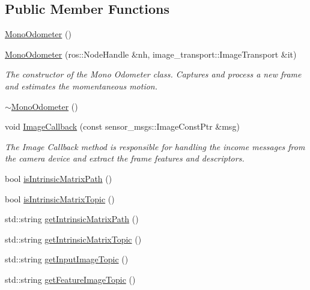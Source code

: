 \subsection*{\-Public \-Member \-Functions}
\begin{DoxyCompactItemize}
\item 
\hyperlink{classLRM_1_1MonoOdometer_a1ea1f329885905fcab0e3f790253df9d}{\-Mono\-Odometer} ()
\item 
\hyperlink{classLRM_1_1MonoOdometer_ae849abdcd3e0b49be6b1672b292c86ba}{\-Mono\-Odometer} (ros\-::\-Node\-Handle \&nh, image\-\_\-transport\-::\-Image\-Transport \&it)
\begin{DoxyCompactList}\small\item\em \-The constructor of the \-Mono \-Odometer class. \-Captures and process a new frame and estimates the momentaneous motion. \end{DoxyCompactList}\item 
\hyperlink{classLRM_1_1MonoOdometer_aadca97effbd3970022f8fdfa42c1177b}{$\sim$\-Mono\-Odometer} ()
\item 
void \hyperlink{classLRM_1_1MonoOdometer_a7205e77893b1f9d4c37de616519ef5ed}{\-Image\-Callback} (const sensor\-\_\-msgs\-::\-Image\-Const\-Ptr \&msg)
\begin{DoxyCompactList}\small\item\em \-The \-Image \-Callback method is responsible for handling the income messages from the camera device and extract the frame features and descriptors. \end{DoxyCompactList}\item 
bool \hyperlink{classLRM_1_1MonoOdometer_aaea86d0c2fc1119b066b310451be4a67}{is\-Intrinsic\-Matrix\-Path} ()
\item 
bool \hyperlink{classLRM_1_1MonoOdometer_ae731298fa8167bacfafd8c3159f21934}{is\-Intrinsic\-Matrix\-Topic} ()
\item 
std\-::string \hyperlink{classLRM_1_1MonoOdometer_ab75736159a13ba537ed8615c84853243}{get\-Intrinsic\-Matrix\-Path} ()
\item 
std\-::string \hyperlink{classLRM_1_1MonoOdometer_a5e0ed50671ae9d479cf6cca4665a0e81}{get\-Intrinsic\-Matrix\-Topic} ()
\item 
std\-::string \hyperlink{classLRM_1_1MonoOdometer_a3174620fdca5f375ec38bc0709c2e1e0}{get\-Input\-Image\-Topic} ()
\item 
std\-::string \hyperlink{classLRM_1_1MonoOdometer_a68f5f4b33141cd2a2ea92db6197db65c}{get\-Feature\-Image\-Topic} ()
\item 

\end{DoxyCompactItemize}
